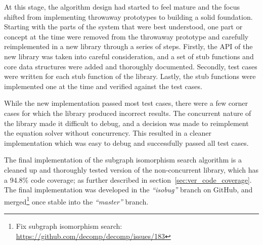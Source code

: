 At this stage, the algorithm design had started to feel mature and the focus shifted from implementing throwaway prototypes to building a solid foundation. Starting with the parts of the system that were best understood, one part or concept at the time were removed from the throwaway prototype and carefully reimplemented in a new library through a series of steps. Firstly, the API of the new library was taken into careful consideration, and a set of stub functions and core data structures were added and thoroughly documented. Secondly, test cases were written for each stub function of the library. Lastly, the stub functions were implemented one at the time and verified against the test cases.

While the new implementation passed most test cases, there were a few corner cases for which the library produced incorrect results. The concurrent nature of the library made it difficult to debug, and a decision was made to reimplement the equation solver without concurrency. This resulted in a cleaner implementation which was easy to debug and successfully passed all test cases.

The final implementation of the subgraph isomorphism search algorithm is a cleaned up and thoroughly tested version of the non-concurrent library, which has a 94.8\% code coverage; as further described in section~\ref{sec:ver_code_coverage}. The final implementation was developed in the \textit{``isobug''} branch on GitHub, and merged\footnote{Fix subgraph isomorphism search: \url{https://github.com/decomp/decomp/issues/183}} once stable into the \textit{``master''} branch.
